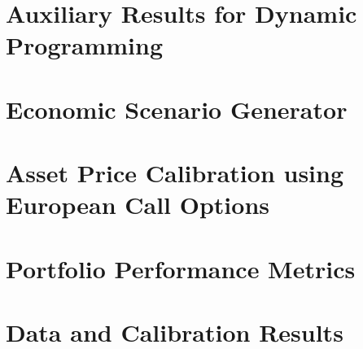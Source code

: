 \documentclass[a4paper, 12pt, openany, twoside]{book}
\makeatletter
\newcommand{\clearemptydoublepage}{%
    \clearpage
    \if@twoside
        \ifodd\c@page
        \else
            \hbox{}%
            \thispagestyle{empty}%
            \newpage
            \if@twocolumn
                \hbox{}%
                \thispagestyle{empty}%
                \newpage
            \fi
        \fi
    \fi
}
\renewcommand{\cleardoublepage}{\clearemptydoublepage}
\theoremstyle{plain}
\theoremstyle{definition}
\theoremstyle{remark}
\numberwithin{equation}{section}
\makeatother
\begin{document}
\chapter{Auxiliary Results for Dynamic Programming}

\cleardoublepage

\chapter{Economic Scenario Generator}

\cleardoublepage

\chapter{Asset Price Calibration using European Call Options}

\cleardoublepage

\chapter{Portfolio Performance Metrics}

\cleardoublepage

\chapter{Data and Calibration Results}

\end{document}
